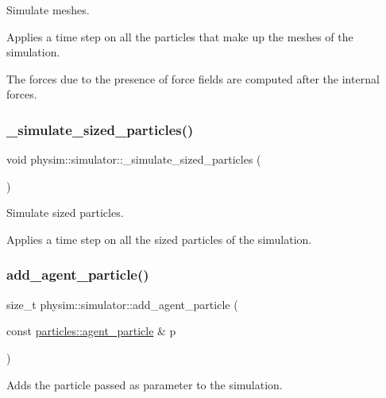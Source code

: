 Simulate meshes. 

Applies a time step on all the particles that make up the meshes of the simulation.

The forces due to the presence of force fields are computed after the internal forces. \mbox{\label{classphysim_1_1simulator_a04922992cda3b1c402da7041324c6049}} 
\subsubsection{\texorpdfstring{\+\_\+simulate\+\_\+sized\+\_\+particles()}{\_simulate\_sized\_particles()}}
{\footnotesize\ttfamily void physim\+::simulator\+::\+\_\+simulate\+\_\+sized\+\_\+particles (\begin{DoxyParamCaption}{ }\end{DoxyParamCaption})\hspace{0.3cm}{\ttfamily [private]}}



Simulate sized particles. 

Applies a time step on all the sized particles of the simulation. \mbox{\label{classphysim_1_1simulator_a73e277b53d80d584fd8d72b586ff7b80}} 
\subsubsection{\texorpdfstring{add\+\_\+agent\+\_\+particle()}{add\_agent\_particle()}}
{\footnotesize\ttfamily size\+\_\+t physim\+::simulator\+::add\+\_\+agent\+\_\+particle (\begin{DoxyParamCaption}\item[{const \hyperlink{classphysim_1_1particles_1_1agent__particle}{particles\+::agent\+\_\+particle} \&}]{p }\end{DoxyParamCaption})}



Adds the particle passed as parameter to the simulation. 

